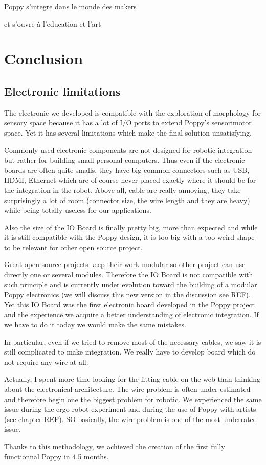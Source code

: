Poppy s'integre dans le monde des makers

et s'ouvre à l'education et l'art





\section{Conclusion} %


\subsection{Electronic limitations} %

The electronic we developed is compatible with the exploration of morphology for sensory space because it has a lot of I/O ports to extend Poppy's sensorimotor space. Yet it has several limitations which make the final solution unsatisfying.

Commonly used electronic components are not designed for robotic integration but rather for building small personal computers. Thus even if the electronic boards are often quite smalls, they have big common connectors such as USB, HDMI, Ethernet which are of course never placed exactly where it should be for the integration in the robot.
Above all, cable are really annoying, they take surprisingly a lot of room (connector size, the wire length and they are heavy) while being totally useless for our applications.

Also the size of the IO Board is finally pretty big, more than expected and while it is still compatible with the Poppy design, it is too big with a too weird shape to be relevant for other open source project.

Great open source projects keep their work modular so other project can use directly one or several modules. Therefore the IO Board is not compatible with such principle and is currently under evolution toward the building of a modular Poppy electronics (we will discuss this new version in the discussion see REF). Yet this IO Board was the first electronic board developed in the Poppy project and the experience we acquire a better understanding of electronic integration. If we have to do it today we would make the same mistakes.

In particular, even if we tried to remove most of the necessary cables, we saw it is still complicated to make integration. We really have to develop board which do not require any wire at all.

Actually, I spent more time looking for the fitting cable on the web than thinking about the electronical architecture. The wire-problem is often under-estimated and therefore begin one the biggest problem for robotic. We experienced the same issue during the ergo-robot experiment and during the use of Poppy with artists (see chapter REF). SO basically, the wire problem is one of the most underrated issue.



Thanks to this methodology, we achieved the creation of the first fully functionnal Poppy in 4.5 months.



